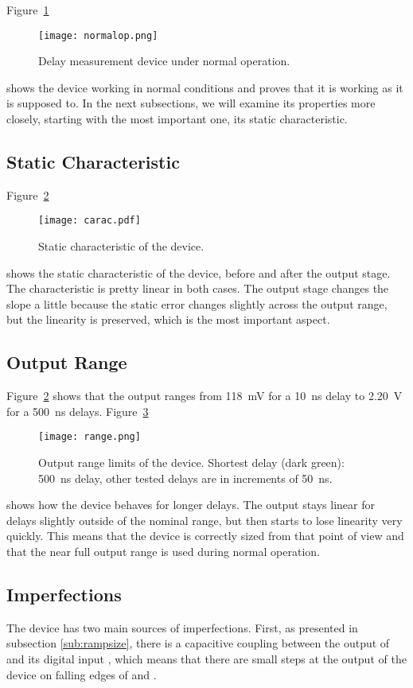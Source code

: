 Figure~\ref{fig:normalop}
\begin{figure}
  \centering
  \texttt{[image: normalop.png]}
  \caption{Delay measurement device under normal operation.\label{fig:normalop}}
\end{figure}
shows the device working in normal conditions and proves that it is working as it is supposed to.
In the next subsections, we will examine its properties more closely, starting with the most important one, its static characteristic.

\subsection{Static Characteristic}
Figure~\ref{fig:carac}
\begin{figure}
  \centering
  \texttt{[image: carac.pdf]}
  \caption{Static characteristic of the device.\label{fig:carac}}
\end{figure}
shows the static characteristic of the device, before and after the output stage. The characteristic is pretty linear in both cases.
The output stage changes the slope a little because the static error changes slightly across the output range, but the linearity is preserved, which is the most important aspect.

\subsection{Output Range}
Figure~\ref{fig:carac} shows that the output ranges from \SI{118}{\milli\volt} for a \SI{10}{\nano\second} delay to \SI{2.20}{\volt} for a \SI{500}{\nano\second} delays.
Figure~\ref{fig:range}
\begin{figure}
  \texttt{[image: range.png]}
  \caption[Output range limits of the device.]{Output range limits of the device. Shortest delay (dark green): \SI{500}{\nano\second} delay, other tested delays are in increments of \SI{50}{\nano\second}.\label{fig:range}}
\end{figure}
shows how the device behaves for longer delays.
The output stays linear for delays slightly outside of the nominal range, but then starts to lose linearity very quickly.
This means that the device is correctly sized from that point of view and that the near full output range is used during normal operation.

\subsection{Imperfections}
The device has two main sources of imperfections.
First, as presented in subsection \ref{sub:rampsize}, there is a capacitive coupling between the output of  and its digital input , which means that there are small steps at the output of the device on falling edges of  and .

